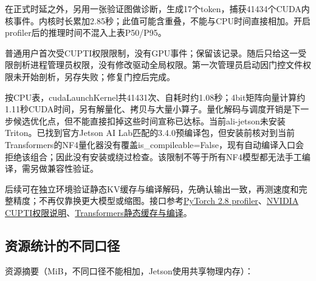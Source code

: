 在正式时延之外，另用一张验证图做诊断，生成17个token，捕获41434个CUDA内核事件。内核时长累加2.85秒；此值可能含重叠，不能与CPU时间直接相加。开启profiler后的推理时间不混入上表P50/P95。

普通用户首次受CUPTI权限限制，没有GPU事件；保留该记录。随后只给这一受限剖析进程管理员权限，没有修改驱动全局权限。第一次管理员启动因门控文件权限未开始剖析，另存失败；修复门控后完成。

按CPU表，cudaLaunchKernel共41431次、自耗时约1.08秒；4bit矩阵向量计算约1.11秒CUDA时间，另有解量化、拷贝与大量小算子。量化解码与调度开销是下一步候选优化点，但不能直接扣掉这些时间宣称已达标。当前ali-jetson未安装Triton。已找到官方Jetson AI Lab匹配的3.4.0预编译包，但安装前核对到当前Transformers的NF4量化器没有覆盖is\_compileable=False，现有自动编译入口会拒绝该组合；因此没有安装或绕过检查。该限制不等于所有NF4模型都无法手工编译，需另做兼容性验证。

后续可在独立环境验证静态KV缓存与编译解码，先确认输出一致，再测速度和完整精度；不再仅靠换更大模型或缩图。接口参考\href{https://docs.pytorch.org/docs/2.8/profiler.html}{PyTorch 2.8 profiler}、\href{https://developer.nvidia.com/nvidia-development-tools-solutions-err-nvgpuctrperm-cupti}{NVIDIA CUPTI权限说明}、\href{https://huggingface.co/docs/transformers/v4.57.1/en/llm_optims}{Transformers静态缓存与编译}。


\subsection{资源统计的不同口径}\label{s24-detail-4}

资源摘要（MiB，不同口径不能相加，Jetson使用共享物理内存）：

